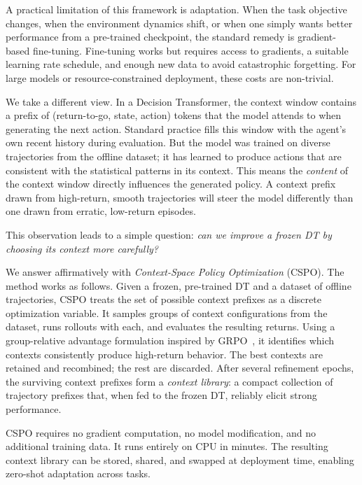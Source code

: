 \documentclass{article}
\newcommand{\cspo}{\textsc{CSPO}}
\begin{document}
A practical limitation of this framework is adaptation. When the task objective changes, when the environment dynamics shift, or when one simply wants better performance from a pre-trained checkpoint, the standard remedy is gradient-based fine-tuning. Fine-tuning works but requires access to gradients, a suitable learning rate schedule, and enough new data to avoid catastrophic forgetting. For large models or resource-constrained deployment, these costs are non-trivial.

We take a different view. In a Decision Transformer, the context window contains a prefix of (return-to-go, state, action) tokens that the model attends to when generating the next action. Standard practice fills this window with the agent's own recent history during evaluation. But the model was trained on diverse trajectories from the offline dataset; it has learned to produce actions that are consistent with the statistical patterns in its context. This means the \emph{content} of the context window directly influences the generated policy. A context prefix drawn from high-return, smooth trajectories will steer the model differently than one drawn from erratic, low-return episodes.

This observation leads to a simple question: \emph{can we improve a frozen DT by choosing its context more carefully?}

We answer affirmatively with \emph{Context-Space Policy Optimization} (\cspo{}). The method works as follows. Given a frozen, pre-trained DT and a dataset of offline trajectories, \cspo{} treats the set of possible context prefixes as a discrete optimization variable. It samples groups of context configurations from the dataset, runs rollouts with each, and evaluates the resulting returns. Using a group-relative advantage formulation inspired by GRPO~\citep{shao2024deepseekmath}, it identifies which contexts consistently produce high-return behavior. The best contexts are retained and recombined; the rest are discarded. After several refinement epochs, the surviving context prefixes form a \emph{context library}: a compact collection of trajectory prefixes that, when fed to the frozen DT, reliably elicit strong performance.

\cspo{} requires no gradient computation, no model modification, and no additional training data. It runs entirely on CPU in minutes. The resulting context library can be stored, shared, and swapped at deployment time, enabling zero-shot adaptation across tasks.
\end{document}
